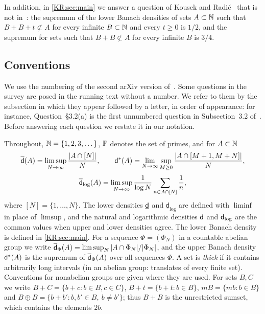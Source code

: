 In addition, in \cref{KR:sec:main} we answer a question of Kousek and
Radi\'c~\cite{kousek2024infinite} that is not in~\cite{kra2023problems}: the supremum of the lower
Banach densities of sets $A\subset\N$ such that $B+B+t\not\subset A$ for every infinite $B\subset\N$
and every $t\ge0$ is $1/2$, and the supremum for sets such that $B+B\not\subset A$ for every
infinite $B$ is $3/4$.

\subsection*{Conventions}
We use the numbering of the second arXiv version of~\cite{kra2023problems}. Some questions in the
survey are posed in the running text without a number. We refer to them by the subsection in which
they appear followed by a letter, in order of appearance: for instance, Question~\S3.2(a) is the
first unnumbered question in Subsection~3.2 of~\cite{kra2023problems}. Before answering each
question we restate it in our notation.

Throughout, $\N=\{1,2,3,\dots\}$, $\P$ denotes the set of primes, and for $A\subset\N$
\[
\udens(A)=\limsup_{N\to\infty}\frac{|A\cap[N]|}{N},\qquad
\ubd(A)=\lim_{N\to\infty}\sup_{M\ge0}\frac{|A\cap[M+1,M+N]|}{N},
\]
\[
\udlog(A)=\limsup_{N\to\infty}\frac{1}{\log N}\sum_{n\in A\cap[N]}\frac1n,
\]
where $[N]=\{1,\dots,N\}$. The lower densities $\ldens$ and $\underline{\mathsf d}_{\log}$ are defined
with $\liminf$ in place of $\limsup$, and the natural and logarithmic densities $\dens$ and $\dlog$
are the common values when upper and lower densities agree. The lower Banach density is defined in
\cref{KR:sec:main}. For a \Fol{} sequence $\Phi=(\Phi_N)$ in a countable abelian group we write
$\udens_\Phi(A)=\limsup_N|A\cap\Phi_N|/|\Phi_N|$, and the upper Banach density $\ubd(A)$ is the
supremum of $\udens_\Phi(A)$ over all \Fol{} sequences $\Phi$.
A set is \emph{thick} if it contains arbitrarily long intervals (in an abelian group: translates of
every finite set). Conventions for nonabelian groups are given where they are used. For sets $B,C$ we write $B+C=\{b+c:b\in B,c\in C\}$, $B+t=\{b+t:b\in B\}$,
$mB=\{mb:b\in B\}$ and $B\oplus B=\{b+b':b,b'\in B,\ b\ne b'\}$; thus $B+B$ is the unrestricted
sumset, which contains the elements $2b$.


